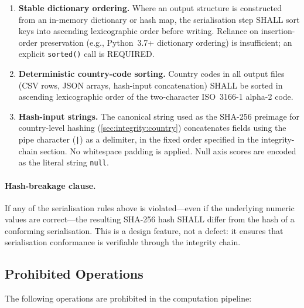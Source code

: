 \begin{enumerate}
  \item \textbf{Stable dictionary ordering.}  Where an output structure is
    constructed from an in-memory dictionary or hash map, the serialisation
    step SHALL sort keys into ascending lexicographic order before writing.
    Reliance on insertion-order preservation (e.g., Python~3.7+ dictionary
    ordering) is insufficient; an explicit \texttt{sorted()} call is
    REQUIRED.

  \item \textbf{Deterministic country-code sorting.}  Country codes
    in all output files (CSV rows, JSON arrays, hash-input concatenation)
    SHALL be sorted in ascending lexicographic order of the two-character
    ISO~3166-1 alpha-2 code.

  \item \textbf{Hash-input strings.}  The canonical string used as the
    SHA-256 preimage for country-level hashing
    (\cref{sec:integrity:country}) concatenates fields using the pipe
    character (\texttt{|}) as a delimiter, in the fixed order specified
    in the integrity-chain section.  No whitespace padding is applied.
    Null axis scores are encoded as the literal string \texttt{null}.
\end{enumerate}

\paragraph{Hash-breakage clause.}
If any of the serialisation rules above is violated---even if the
underlying numeric values are correct---the resulting SHA-256 hash
SHALL differ from the hash of a conforming serialisation.  This is a
design feature, not a defect: it ensures that serialisation conformance
is verifiable through the integrity chain.

\subsection{Prohibited Operations}\label{sec:det:prohibited}

The following operations are prohibited in the computation pipeline:

